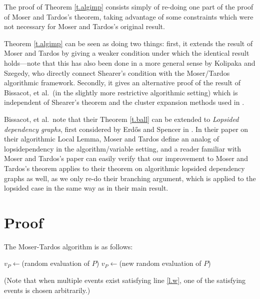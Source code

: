 \documentclass[letterpaper]{article}
\newcommand{\vbl}{\textrm{vbl}}
\newcommand{\ppp}{{\cal P}}
\theoremstyle{definition}
\theoremstyle{remark}
\begin{document}
The proof of Theorem \ref{t.algimp} consists simply of re-doing one part of the proof of Moser and Tardos's theorem, taking advantage of some constraints which were not necessary for Moser and Tardos's original result.

Theorem \ref{t.algimp} can be seen as doing two things: first, it extends the result of Moser and Tardos by giving a weaker condition under which the identical result holds---note that this has also been done in a more general sense by Kolipaka and Szegedy\cite{KS}, who directly connect Shearer's condition with the Moser/Tardos algorithmic framework. Secondly, it gives an alternative proof of the result of Bissacot, et al.~(in the slightly more restrictive algorithmic setting) which is independent of Shearer's theorem and the cluster expansion methods used in \cite{cluster}.

\bigskip 

Bissacot, et al.~note that their Theorem \ref{t.ball} can be extended to \emph{Lopsided dependency graphs}, first considered by Erd\H{o}s and Spencer in \cite{ES}.  In their paper on their algorithmic Local Lemma, Moser and Tardos define an analog of lopsidependency in the algorithm/variable setting, and a reader familiar with Moser and Tardos's paper can easily verify that our improvement to Moser and Tardos's theorem applies to their theorem on algorithmic lopsided dependency graphs as well, as we only re-do their branching argument, which is applied to the lopsided case in the same way as in their main result.


\section{Proof}
\label{s.proof}

The Moser-Tardos algorithm is as follows:
\begin{algorithmic}[1]
 \Procedure{Moser-Tardos}{$\ppp$}
  \For {all $P\in \ppp$}
  \State $v_P\gets $(random evaluation of $P$)
  \EndFor
   \label{l.w}
   \For {all $P\in \vbl(A)$}
   \State $v_P\gets $(new random evaluation of $P$)
  \EndFor
   \EndWhile
  \EndProcedure
\end{algorithmic}
\noindent (Note that when multiple events exist satisfying line \ref{l.w}, one of the satisfying events is chosen arbitrarily.)
\end{document}
